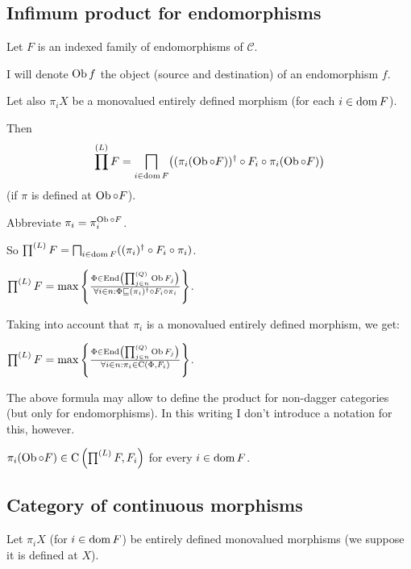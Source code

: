 \subsection{Infimum product for endomorphisms}

Let $F$ is an indexed family of endomorphisms of $\mathcal{C}$.

I will denote $\operatorname{Ob} f$ the object (source and destination) of an
endomorphism $f$.

Let also $\pi_i X$ be a monovalued entirely defined morphism (for each $i \in
\operatorname{dom} F$).

Then \[ \prod^{(L)} F = \bigsqcap_{i \in \operatorname{dom} F} \bigl((\pi_i(\operatorname{Ob}\circ F))^{\dagger} \circ F_i \circ \pi_i(\operatorname{Ob}\circ F)\bigr) \] (if $\pi$ is defined at $\operatorname{Ob}\circ F$).

Abbreviate $\pi_i = \pi^{\operatorname{Ob}\circ F}_i$.

So $\prod^{(L)} F = \bigsqcap_{i \in \operatorname{dom} F} ((\pi_i)^{\dagger} \circ
F_i \circ \pi_i)$.

$\prod^{(L)} F = \max \left\{ \frac{ \Phi \in \operatorname{End} \left( \prod^{(Q)}_{j \in n}
\operatorname{Ob} F_j \right) }{ \forall i \in n : \Phi
\sqsubseteq (\pi_i)^{\dagger} \circ F_i \circ \pi_i }\right\}$.

Taking into account that $\pi_i$ is a monovalued entirely defined morphism, we
get:

\begin{obvious}
$\prod^{(L)} F = \max \left\{ \frac{ \Phi \in \operatorname{End} \left( \prod^{(Q)}_{j \in
n} \operatorname{Ob} F_j \right) }{ \forall i \in n : \pi_i
\in \mathrm{C} (\Phi , F_i) }\right\}$.
\end{obvious}

\begin{rem}
  The above formula may allow to define the product for non-dagger categories
  (but only for endomorphisms). In this writing I don't introduce a notation
  for this, however.
\end{rem}

\begin{cor}
  $\pi_i (\operatorname{Ob}\circ F) \in \mathrm{C} \left( \prod^{(L)} F , F_i \right)$ for every $i \in
  \operatorname{dom} F$.
\end{cor}

\subsection{Category of continuous morphisms}

Let $\pi_i X$ (for $i \in \operatorname{dom} F$) be entirely defined
monovalued morphisms (we suppose it is defined at $X$).

